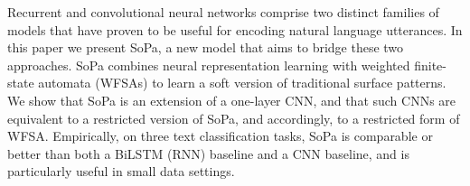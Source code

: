 Recurrent and convolutional neural networks comprise two distinct families of models that have proven to be useful for encoding natural language utterances. In this paper we present SoPa, a new model that aims to bridge these two approaches. SoPa combines neural representation learning with weighted finite-state automata (WFSAs) to learn a soft version of traditional surface patterns. We show that SoPa is an extension of a one-layer CNN, and that such CNNs are equivalent to a restricted version of SoPa, and accordingly, to a restricted form of WFSA. Empirically, on three text classification tasks, SoPa is comparable or better than both a BiLSTM (RNN) baseline and a CNN baseline, and is particularly useful in small data settings.
